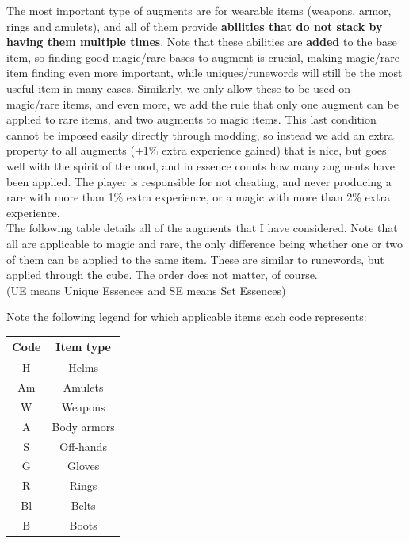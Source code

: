 \documentclass[12pt,a4paper]{article}
\begin{document}
The most important type of augments are for wearable items (weapons, armor, rings and amulets), and all of them provide {\bf{abilities that do not stack by having them multiple times}}. Note that these abilities are {\bf{added}} to the base item, so finding good magic/rare bases to augment is crucial, making magic/rare item finding even more important, while uniques/runewords will still be the most useful item in many cases. Similarly, we only allow these to be used on magic/rare items, and even more, we add the rule that only one augment can be applied to rare items, and two augments to magic items. This last condition cannot be imposed easily directly through modding, so instead we add an extra property to all augments (+1\% extra experience gained) that is nice, but goes well with the spirit of the mod, and in essence counts how many augments have been applied. The player is responsible for not cheating, and never producing a rare with more than 1\% extra experience, or a magic with more than 2\% extra experience.\\

The following table details all of the augments that I have considered. Note that all are applicable to magic and rare, the only difference being whether one or two of them can be applied to the same item. These are similar to runewords, but applied through the cube. The order does not matter, of course.\\

(UE means Unique Essences and SE means Set Essences)

Note the following legend for which applicable items each code represents:

\begin{tabular}{|c|c|}
\hline
{\bf{Code}}&{\bf{Item type}}\\
\hline
H&Helms\\
\hline
Am&Amulets\\
\hline
W&Weapons\\
\hline
A&Body armors\\
\hline
S&Off-hands\\
\hline
G&Gloves\\
\hline
R&Rings\\
\hline
Bl&Belts\\
\hline
B&Boots\\
\hline
\end{tabular}
\end{document}
